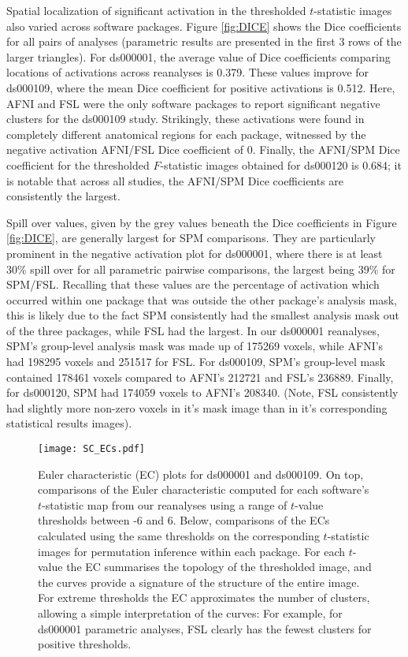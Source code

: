 Spatial localization of significant activation in the thresholded $t$-statistic images also varied across software packages. Figure \ref{fig:DICE} shows the Dice coefficients for all pairs of analyses (parametric results are presented in the first 3 rows of the larger triangles). For ds000001, the average value of Dice coefficients comparing locations of activations across reanalyses is 0.379. These values improve for ds000109, where the mean Dice coefficient for positive activations is 0.512. Here, AFNI and FSL were the only software packages to report significant negative clusters for the ds000109 study. Strikingly, these activations were found in completely different anatomical regions for each package, witnessed by the negative activation AFNI/FSL Dice coefficient of 0. Finally, the AFNI/SPM Dice coefficient for the thresholded $F$-statistic images obtained for ds000120 is 0.684; it is notable that across all studies, the AFNI/SPM Dice coefficients are consistently the largest.

Spill over values, given by the grey values beneath the Dice coefficients in Figure \ref{fig:DICE}, are generally largest for SPM comparisons. They are particularly prominent in the negative activation plot for ds000001, where there is at least 30\% spill over for all parametric pairwise comparisons, the largest being 39\% for SPM/FSL. Recalling that these values are the percentage of activation which occurred within one package that was outside the other package's analysis mask, this is likely due to the fact SPM consistently had the smallest analysis mask out of the three packages, while FSL had the largest. In our ds000001 reanalyses, SPM's group-level analysis mask was made up of 175269 voxels, while AFNI's had 198295 voxels and 251517 for FSL.  For ds000109, SPM's group-level mask contained 178461 voxels compared to AFNI's 212721 and FSL's 236889. Finally, for ds000120, SPM had 174059 voxels to AFNI's 208340. (Note, FSL consistently had slightly more non-zero voxels in it's mask image than in it's corresponding statistical results images).

\begin{sidewaysfigure}[htbp]
\centering
	\texttt{[image: SC\_ECs.pdf]}	
\caption{Euler characteristic (EC) plots for ds000001 and ds000109. On top, comparisons of the Euler characteristic computed for each software's $t$-statistic map from our reanalyses using a range of $t$-value thresholds between -6 and 6. Below, comparisons of the ECs calculated using the same thresholds on the corresponding $t$-statistic images for permutation inference within each package. For each $t$-value the EC summarises the topology of the thresholded image, and the curves provide a signature of the structure of the entire image. For extreme thresholds the EC approximates the number of clusters, allowing a simple interpretation of the curves: For example, for ds000001 parametric analyses, FSL clearly has the fewest clusters for positive thresholds.}
\label{fig:ECs}
\end{sidewaysfigure}

